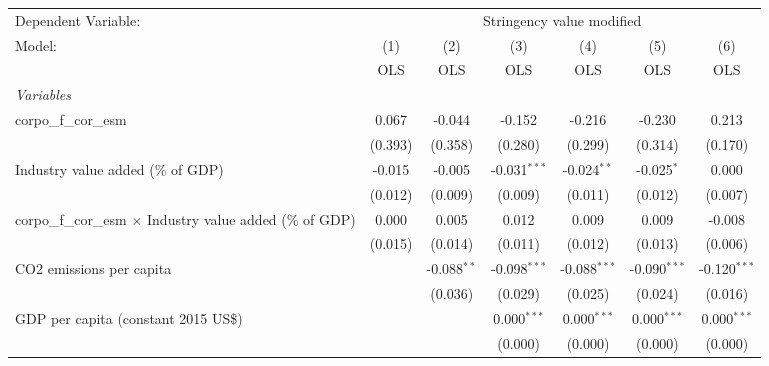 
\begingroup
\centering
\begin{tabular}{lcccccc}
   \toprule
   Dependent Variable: & \multicolumn{6}{c}{Stringency value modified}\\
   Model:                                                            & (1)     & (2)           & (3)            & (4)            & (5)            & (6)\\  
                                                                     &  OLS    & OLS           & OLS            & OLS            & OLS            & OLS\\  
   \midrule
   \emph{Variables}\\
   corpo\_f\_cor\_esm                                                & 0.067   & -0.044        & -0.152         & -0.216         & -0.230         & 0.213\\   
                                                                     & (0.393) & (0.358)       & (0.280)        & (0.299)        & (0.314)        & (0.170)\\   
   Industry value added (\% of GDP)                                  & -0.015  & -0.005        & -0.031$^{***}$ & -0.024$^{**}$  & -0.025$^{*}$   & 0.000\\   
                                                                     & (0.012) & (0.009)       & (0.009)        & (0.011)        & (0.012)        & (0.007)\\   
   corpo\_f\_cor\_esm $\times$ Industry value added (\% of GDP)      & 0.000   & 0.005         & 0.012          & 0.009          & 0.009          & -0.008\\   
                                                                     & (0.015) & (0.014)       & (0.011)        & (0.012)        & (0.013)        & (0.006)\\   
   CO2 emissions per capita                                          &         & -0.088$^{**}$ & -0.098$^{***}$ & -0.088$^{***}$ & -0.090$^{***}$ & -0.120$^{***}$\\   
                                                                     &         & (0.036)       & (0.029)        & (0.025)        & (0.024)        & (0.016)\\   
   GDP per capita (constant 2015 US\$)                               &         &               & 0.000$^{***}$  & 0.000$^{***}$  & 0.000$^{***}$  & 0.000$^{***}$\\   
                                                                     &         &               & (0.000)        & (0.000)        & (0.000)        & (0.000)\\   

\end{tabular}
